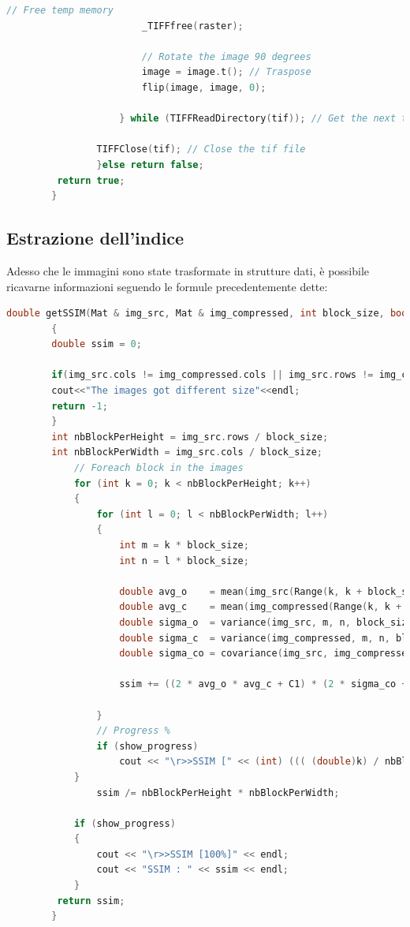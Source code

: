 \documentclass[a4paper,11pt]{article}
\begin{document}
\begin{lstlisting}[language=C++]
                        // Free temp memory
                        _TIFFfree(raster); 

                        // Rotate the image 90 degrees 
                        image = image.t(); // Traspose
                        flip(image, image, 0);
                    
                    } while (TIFFReadDirectory(tif)); // Get the next tif to go into the channels

                TIFFClose(tif); // Close the tif file
                }else return false;
         return true;
        }
    \end{lstlisting}

    \newpage

    \subsection{Estrazione dell'indice}
    Adesso che le immagini sono state trasformate in strutture dati, è possibile ricavarne informazioni seguendo le formule precedentemente dette:
    \begin{lstlisting}[language=C++]
        double getSSIM(Mat & img_src, Mat & img_compressed, int block_size, bool show_progress = true)
        {
        double ssim = 0;

        if(img_src.cols != img_compressed.cols || img_src.rows != img_compressed.rows){
        cout<<"The images got different size"<<endl;
        return -1;
        }
        int nbBlockPerHeight = img_src.rows / block_size;
        int nbBlockPerWidth = img_src.cols / block_size;
            // Foreach block in the images
            for (int k = 0; k < nbBlockPerHeight; k++)
            {
                for (int l = 0; l < nbBlockPerWidth; l++)
                {
                    int m = k * block_size;
                    int n = l * block_size;

                    double avg_o 	= mean(img_src(Range(k, k + block_size), Range(l, l + block_size)))[0];
                    double avg_c 	= mean(img_compressed(Range(k, k + block_size), Range(l, l + block_size)))[0];
                    double sigma_o 	= variance(img_src, m, n, block_size);
                    double sigma_c 	= variance(img_compressed, m, n, block_size);
                    double sigma_co	= covariance(img_src, img_compressed, m, n, block_size);

                    ssim += ((2 * avg_o * avg_c + C1) * (2 * sigma_co + C2)) / ((avg_o * avg_o + avg_c * avg_c + C1) * (sigma_o * sigma_o + sigma_c * sigma_c + C2));
                    
                }
                // Progress %
                if (show_progress)
                    cout << "\r>>SSIM [" << (int) ((( (double)k) / nbBlockPerHeight) * 100) << "%]";
            }
                ssim /= nbBlockPerHeight * nbBlockPerWidth;

            if (show_progress)
            {
                cout << "\r>>SSIM [100%]" << endl;
                cout << "SSIM : " << ssim << endl;
            }
         return ssim;
        }
    \end{lstlisting}
\end{document}
